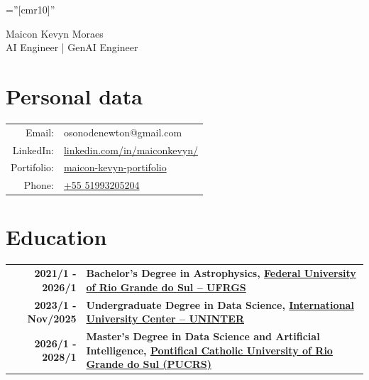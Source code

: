 \documentclass[a4paper,10pt]{article}
\begin{document}
\pagestyle{empty} %

\font\fb=''[cmr10]'' %

\par{\centering
		{\Huge Maicon Kevyn Moraes
		}\vspace{0.1cm}\\AI Engineer | GenAI Engineer\\{\color{gray}}\bigskip\par}

\section{Personal data}

\begin{tabular}{rl}
    {Email:}     & osonodenewton@gmail.com \\
    {LinkedIn:} & \href{https://www.linkedin.com/in/maiconkevyn/}{linkedin.com/in/maiconkevyn/} \\
    {Portifolio:} &
    \href{https://maicon-kevyn-portifolio.vercel.app/}{maicon-kevyn-portifolio}  \\
    {Phone:} & \href{}{+55 51993205204}

\end{tabular}

\section{Education}
\begin{tabular}{r|p{11cm}}
 \textbf{ 2021/1 - 2026/1}& \textbf{Bachelor's Degree in Astrophysics, \href{http://www.ufrgs.br/english/home}{Federal University of Rio Grande do Sul – UFRGS} }\\

\textbf{ 2023/1 - Nov/2025}& \textbf{Undergraduate Degree in Data Science, \href{https://www.uninter.com/}{International University Center – UNINTER} }\\

\textbf{2026/1 - 2028/1} & \textbf{Master's Degree in Data Science and Artificial Intelligence, \href{https://www.pucrs.br/}{Pontifical Catholic University of Rio Grande do Sul (PUCRS)}} \\



 \end{tabular}
\end{document}
